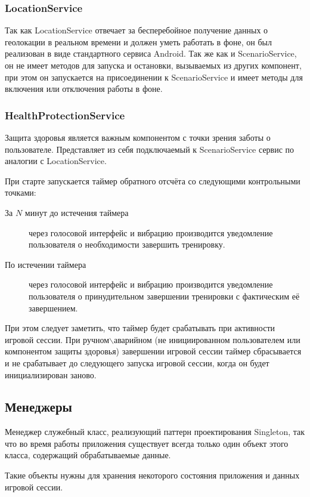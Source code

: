 \subsubsection*{LocationService}
Так как LocationService отвечает за бесперебойное получение данных о геолокации в реальном времени и должен уметь работать в фоне, он был реализован в виде стандартного сервиса Android. Так же как и ScenarioService, он не имеет методов для запуска и остановки, вызываемых из других компонент, при этом он запускается на присоединении к ScenarioService и имеет методы для включения или отключения работы в фоне.

\subsubsection*{HealthProtectionService}
Защита здоровья является важным компонентом с точки зрения заботы о пользователе. Представляет из себя подключаемый к ScenarioService сервис по аналогии с LocationService. 

При старте запускается таймер обратного отсчёта со следующими контрольными точками:
\begin{description}
	\item[За $N$ минут до истечения таймера] через голосовой интерфейс и вибрацию производится уведомление пользователя о необходимости завершить тренировку.
	\item[По истечении таймера] через голосовой интерфейс и вибрацию производится уведомление пользователя о принудительном завершении тренировки с фактическим её завершением.
\end{description}
\smallskip
При этом следует заметить, что таймер будет срабатывать при активности игровой сессии. При ручном$\backslash$аварийном (не инициированном пользователем или компонентом защиты здоровья) завершении игровой сессии таймер сбрасывается и не срабатывает до следующего запуска игровой сессии, когда он будет инициализирован заново.

\subsection{Менеджеры}
Менеджер \textemdash\space служебный класс, реализующий паттерн проектирования Singleton, так что во время работы приложения существует всегда только один объект этого класса, содержащий обрабатываемые данные.

Такие объекты нужны для хранения некоторого состояния приложения и данных игровой сессии.

